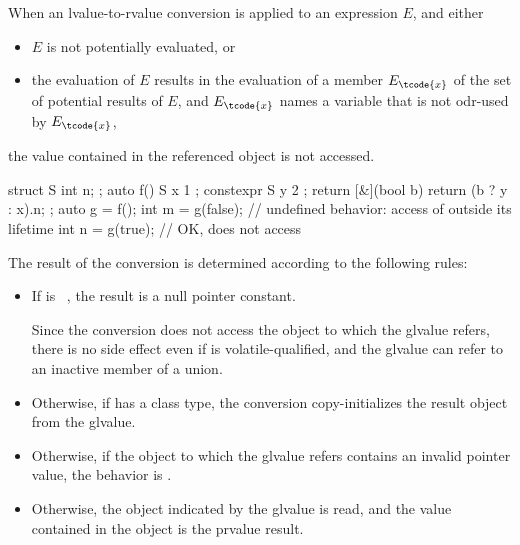 \pnum
When an lvalue-to-rvalue conversion
is applied to an expression $E$, and either
\begin{itemize}
\item $E$ is not potentially evaluated, or
\item the evaluation of $E$ results in the evaluation of a member
      $E_\tcode{x}$ of the set of potential results of $E$, and $E_\tcode{x}$
      names a variable  that is not odr-used by
      $E_\tcode{x}$,
\end{itemize}
the value contained in the referenced object is not accessed.
\begin{example}
\begin{codeblock}
struct S { int n; };
auto f() {
  S x { 1 };
  constexpr S y { 2 };
  return [&](bool b) { return (b ? y : x).n; };
}
auto g = f();
int m = g(false);   // undefined behavior: access of  outside its lifetime
int n = g(true);    // OK, does not access 
\end{codeblock}
\end{example}

\pnum
The result of the conversion is determined according to the
following rules:

\begin{itemize}

\item If  is \cv{}~, the result is a
null pointer constant.
\begin{note}
Since the conversion does not access the object to which the glvalue refers,
there is no side effect even if  is volatile-qualified, and
the glvalue can refer to an inactive member of a union.
\end{note}

\item Otherwise, if  has a class
type, the conversion copy-initializes the result object from
the glvalue.

\item Otherwise, if the object to which the glvalue refers contains an invalid
pointer value, the behavior is
.

\item Otherwise, the object indicated by the glvalue is read,
and the value contained in the object is the prvalue result.
\end{itemize}


